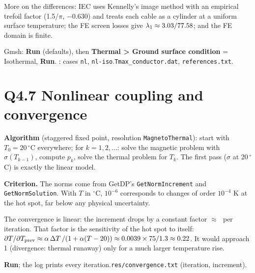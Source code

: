 \begin{center}\def\figw{0.75\linewidth}\def\figh{4.6cm}
\end{center}
More on the differences: IEC uses Kennelly's image method with an empirical trefoil factor
(1.5/\(\pi\), \(-0.630\)) and treats each cable as a cylinder at a uniform surface temperature; the FE
screen losses give \(\lambda_1\approx3.03/77.58\); and the FE domain is finite.

{Gmsh: \textbf{Run} (defaults), then \textbf{Thermal > Ground surface condition} = Isothermal, \textbf{Run}.
\runall: cases \texttt{nl}, \texttt{nl-iso}.}{\texttt{Tmax\_conductor.dat}, \texttt{references.txt}.}

\section*{Q4.7 Nonlinear coupling and convergence}
\assignmentquestion{\QuestionFourSeven}
\answer{\AnsFourSeven}
\textbf{Algorithm} (staggered fixed point, resolution \texttt{MagnetoThermal}): start with
\(T_0=20\,^\circ\)C everywhere; for \(k=1,2,\dots\): solve the magnetic problem with
\(\sigma(T_{k-1})\), compute \(p_k\), solve the thermal problem for \(T_k\).
The first pass (\(\sigma\) at 20\,\(^\circ\)C) is exactly the linear model.

\textbf{Criterion.} The norms come from GetDP's \texttt{GetNormIncrement} and \texttt{GetNormSolution}.
With \(T\) in \(^\circ\)C, \(10^{-6}\) corresponds to changes of order \(10^{-4}\) K at the hot spot, far below
any physical uncertainty.

\begin{center}\def\figw{0.75\linewidth}\def\figh{5.5cm}
\end{center}
The convergence is linear: the increment drops by a constant factor \(\approx\)\,\ConvRate\ per
iteration. That factor is the sensitivity of the hot spot to itself:
\(\partial T/\partial T_{\rm prev}\approx\alpha\,\Delta T\,/(1+\alpha(T-20))\approx0.0039\times75/1.3\approx0.22\).
It would approach 1 (divergence: thermal runaway) only for a much larger temperature rise.

{\textbf{Run}; the log prints every iteration.}{\texttt{res/convergence.txt} (iteration, increment).}

